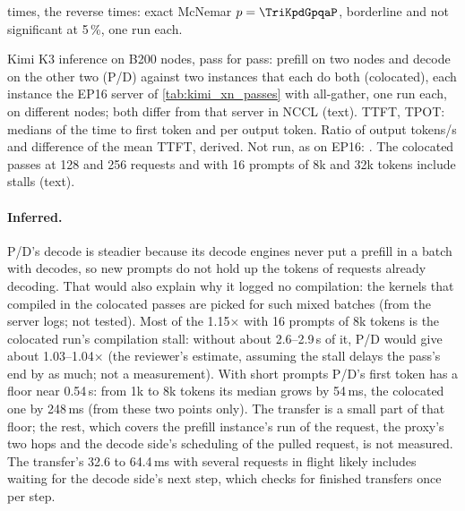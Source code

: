 times, the reverse \TriKpdGpqaOnlyPd{} times: exact McNemar $p = \TriKpdGpqaP$, borderline and not significant at 5\,\%, one run each.

\begin{table}[h]
  \caption{Kimi K3 inference on \TriKpdNodes{} B200 nodes, pass for pass: prefill on two nodes and decode on the other two (P/D) against two instances that each do both (colocated), each instance the EP16 server of \cref{tab:kimi_xn_passes} with all-gather, one run each, on different nodes; both differ from that server in NCCL (text). TTFT, TPOT: medians of the time to first token and per output token. Ratio of output tokens/s and difference of the mean TTFT, derived. Not run, as on EP16: \TriKpdNotRun. The colocated passes at 128 and 256 requests and with 16 prompts of 8k and 32k tokens include stalls (text).}
  \label{tab:kimi_pd_passes}
  \centering\scriptsize
  \begin{adjustbox}{max width=\linewidth}
  \end{adjustbox}
\end{table}

\paragraph{Inferred.} P/D's decode is steadier because its decode engines never put a prefill in a batch with decodes, so new prompts do not hold up the tokens of requests already decoding. That would also explain why it logged no compilation: the kernels that compiled in the colocated passes are picked for such mixed batches (from the server logs; not tested). Most of the 1.15$\times$ with 16 prompts of 8k tokens is the colocated run's compilation stall: without about 2.6--2.9\,s of it, P/D would give about 1.03--1.04$\times$ (the reviewer's estimate, assuming the stall delays the pass's end by as much; not a measurement). With short prompts P/D's first token has a floor near 0.54\,s: from 1k to 8k tokens its median grows by 54\,ms, the colocated one by 248\,ms (from these two points only). The transfer is a small part of that floor; the rest, which covers the prefill instance's run of the request, the proxy's two hops and the decode side's scheduling of the pulled request, is not measured. The transfer's 32.6 to 64.4\,ms with several requests in flight likely includes waiting for the decode side's next step, which checks for finished transfers once per step.

